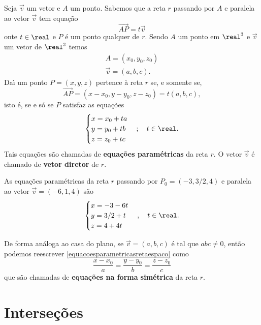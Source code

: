 Seja $\vec{v}$ um vetor e $A$ um ponto. Sabemos que a reta $r$ passando por $A$ e paralela ao vetor $\vec{v}$ tem equa\c{c}\~ao
\begin{equation}
    \vec{AP} = t\vec{v}
\end{equation}
onte $t \in \real$ e $P$ \'e um ponto qualquer de $r$. Sendo $A$ um ponto em $\real^3$ e $\vec{v}$ um vetor de $\real^3$ temos
\begin{align*}
    A = (x_0, y_0, z_0)\\
    \vec{v} = (a, b, c).
\end{align*}
Da{\'\i} um ponto $P = (x, y, z)$ pertence \`a reta $r$ se, e somente se,
\[
    \vec{AP} = (x - x_0, y - y_0, z - z_0) = t(a, b, c),
\]
isto \'e, se e s\'o se $P$ satisfaz as equa\c{c}\~oes
\begin{equation}\label{equacoesparametricasretaespaco}
    \begin{cases}
        x = x_0 + ta\\
        y = y_0 + tb\\
        z = z_0 + tc
    \end{cases}; \quad t \in \real.
\end{equation}
Tais equa\c{c}\~oes s\~ao chamadas de \textbf{equa\c{c}\~oes param\'etricas} da reta $r$. O vetor $\vec{v}$ \'e chamado de \textbf{vetor diretor} de $r$.

\begin{exemplo}
    As equa\c{c}\~oes param\'etricas da reta $r$ passando por $P_0 = (-3,3/2,4)$ e paralela ao vetor $\vec{v} = (-6,1,4)$ s\~ao
    \[
        \begin{cases}
            x = -3 - 6t\\
            y = 3/2 + t\\
            z = 4 + 4t
        \end{cases},\quad t \in \real.
    \]
\end{exemplo}

De forma an\'aloga ao casa do plano, se $\vec{v} = (a,b,c)$ \'e tal que $abc \ne 0$, ent\~ao podemos reescrever \eqref{equacoesparametricasretaespaco} como
\[
    \dfrac{x - x_0}{a} = \dfrac{y - y_0}{b} = \dfrac{z - z_0}{c}
\]
que s\~ao chamadas de \textbf{equa\c{c}\~oes na forma sim\'etrica} da reta $r$.
\section{Interse\c{c}\~oes} %
\label{sec:intersecoes}
